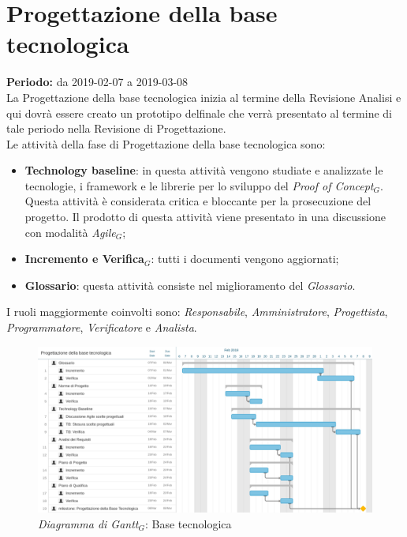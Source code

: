 \section{Progettazione della base tecnologica}
\textbf{Periodo:} da 2019-02-07 a 2019-03-08\\
La Progettazione della base tecnologica inizia al termine della Revisione Analisi e qui dovrà essere creato un prototipo delfinale che verrà presentato al termine di tale periodo nella Revisione di Progettazione.\\
Le attività della fase di Progettazione della base tecnologica sono:
\begin{itemize}
    \item\textbf{Technology baseline}: in questa attività vengono studiate e analizzate le tecnologie, i framework e le librerie per lo sviluppo del \textit{Proof of Concept$_{G}$}. Questa attività è considerata critica e bloccante per la prosecuzione del progetto.
    Il prodotto di questa attività viene presentato in una discussione con modalità \textit{Agile$_{G}$};
    \item \textbf{Incremento e Verifica$_{G}$}: tutti i documenti vengono aggiornati;
    \item \textbf{Glossario}: questa attività consiste nel miglioramento del \textit{Glossario}.
\end{itemize}
I ruoli maggiormente coinvolti sono: \textit{Responsabile}, \textit{Amministratore}, \textit{Progettista}, \textit{Programmatore}, \textit{Verificatore} e \textit{Analista}.
\begin{figure} [h]
    \centering
    \includegraphics[scale=0.13]{./images/base_tecnologica.jpg}
    \caption{\textit{Diagramma di Gantt$_{G}$}: Base tecnologica }\label{}
\end{figure}
\newpage
